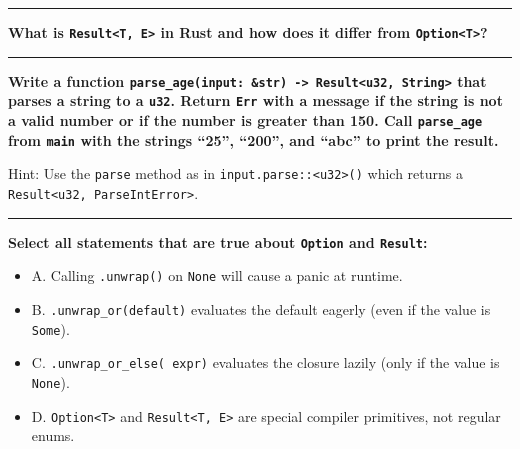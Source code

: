\documentclass[
  11pt,
]{article}
\newenvironment{Shaded}{}{}
\providecommand{\tightlist}{%
  \setlength{\itemsep}{0pt}\setlength{\parskip}{0pt}}
\begin{document}
\begin{center}\rule{0.5\linewidth}{0.5pt}\end{center}

\textbf{What is \texttt{Result\textless{}T,\ E\textgreater{}} in Rust
and how does it differ from \texttt{Option\textless{}T\textgreater{}}?}

\begin{center}\rule{0.5\linewidth}{0.5pt}\end{center}

\textbf{Write a function
\texttt{parse\_age(input:\ \&str)\ -\textgreater{}\ Result\textless{}u32,\ String\textgreater{}}
that parses a string to a \texttt{u32}. Return \texttt{Err} with a
message if the string is not a valid number or if the number is greater
than 150. Call \texttt{parse\_age} from \texttt{main} with the strings
``25'', ``200'', and ``abc'' to print the result.}

Hint: Use the \texttt{parse} method as in
\texttt{input.parse::\textless{}u32\textgreater{}()} which returns a
\texttt{Result\textless{}u32,\ ParseIntError\textgreater{}}.

\begin{Shaded}
\begin{Highlighting}[]

\end{Highlighting}
\end{Shaded}

\begin{center}\rule{0.5\linewidth}{0.5pt}\end{center}

\textbf{Select all statements that are true about \texttt{Option} and
\texttt{Result}:}

\begin{itemize}
\tightlist
\item[$\square$]
  A. Calling \texttt{.unwrap()} on \texttt{None} will cause a panic at
  runtime.
\item[$\square$]
  B. \texttt{.unwrap\_or(default)} evaluates the default eagerly (even
  if the value is \texttt{Some}).
\item[$\square$]
  C. \texttt{.unwrap\_or\_else(\textbar{}\textbar{}\ expr)} evaluates
  the closure lazily (only if the value is \texttt{None}).
\item[$\square$]
  D. \texttt{Option\textless{}T\textgreater{}} and
  \texttt{Result\textless{}T,\ E\textgreater{}} are special compiler
  primitives, not regular enums.
\end{itemize}
\end{document}
